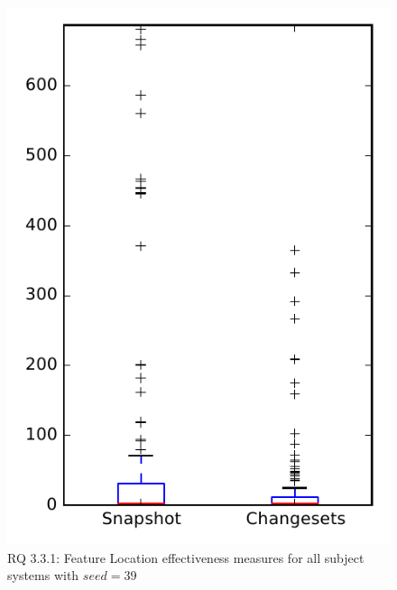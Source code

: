 
\begin{figure}
\centering
\includegraphics[height=0.4\textheight]{figures/flt_seed/rq1_overview_39}
\caption{RQ 3.3.1: Feature Location effectiveness measures for all subject systems with $seed=39$}
\label{fig:flt_seed:rq1:overview}
\end{figure}
